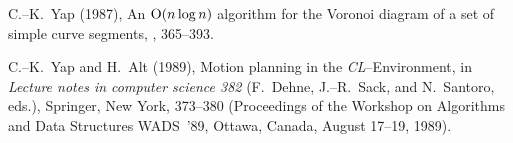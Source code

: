 \begin{thebibliography}{99}

C.--K.~Yap (1987), An ${\rm O}(n\log n)$ algorithm for the Voronoi
diagram of a set of simple curve segments, , 365--393.

C.--K.~Yap and H.~Alt (1989), Motion planning in the {\it
CL\/}--Environment, in {\it Lecture notes in computer science 382\/}
(F.~Dehne, J.--R.~Sack, and N.~Santoro, eds.), Springer, New York,
373--380 (Proceedings of the Workshop on Algorithms and Data
Structures WADS~'89, Ottawa, Canada, August 17--19, 1989).

\end{thebibliography}



